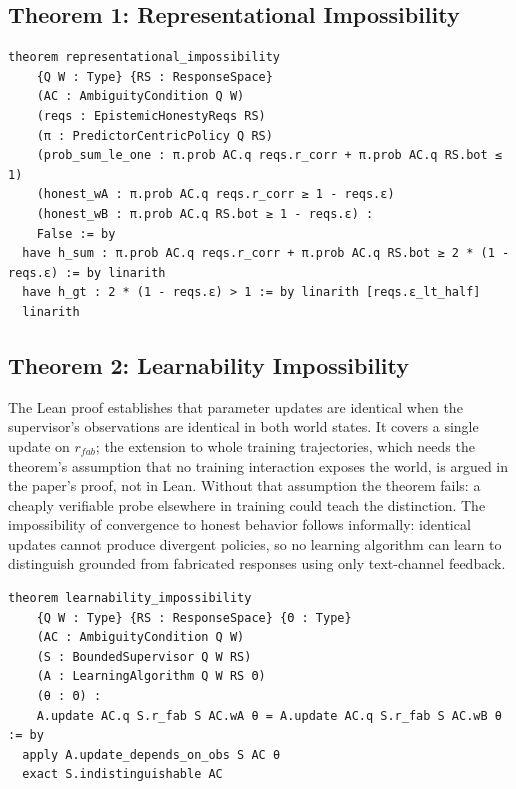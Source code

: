 \documentclass[11pt]{article}
\begin{document}
\subsection{Theorem 1: Representational Impossibility}

\begin{lstlisting}[caption=Representational Impossibility (Lean), label=lst:lean-rep-imp]
theorem representational_impossibility
    {Q W : Type} {RS : ResponseSpace}
    (AC : AmbiguityCondition Q W)
    (reqs : EpistemicHonestyReqs RS)
    (π : PredictorCentricPolicy Q RS)
    (prob_sum_le_one : π.prob AC.q reqs.r_corr + π.prob AC.q RS.bot ≤ 1)
    (honest_wA : π.prob AC.q reqs.r_corr ≥ 1 - reqs.ε)
    (honest_wB : π.prob AC.q RS.bot ≥ 1 - reqs.ε) :
    False := by
  have h_sum : π.prob AC.q reqs.r_corr + π.prob AC.q RS.bot ≥ 2 * (1 - reqs.ε) := by linarith
  have h_gt : 2 * (1 - reqs.ε) > 1 := by linarith [reqs.ε_lt_half]
  linarith
\end{lstlisting}

\subsection{Theorem 2: Learnability Impossibility}

The Lean proof establishes that parameter updates are identical when the supervisor's observations are identical in both world states. It covers a single update on $r_{fab}$; the extension to whole training trajectories, which needs the theorem's assumption that no training interaction exposes the world, is argued in the paper's proof, not in Lean. Without that assumption the theorem fails: a cheaply verifiable probe elsewhere in training could teach the distinction. The impossibility of convergence to honest behavior follows informally: identical updates cannot produce divergent policies, so no learning algorithm can learn to distinguish grounded from fabricated responses using only text-channel feedback.

\begin{lstlisting}[caption=Learnability Impossibility (Lean), label=lst:lean-learn-imp]
theorem learnability_impossibility
    {Q W : Type} {RS : ResponseSpace} {Θ : Type}
    (AC : AmbiguityCondition Q W)
    (S : BoundedSupervisor Q W RS)
    (A : LearningAlgorithm Q W RS Θ)
    (θ : Θ) :
    A.update AC.q S.r_fab S AC.wA θ = A.update AC.q S.r_fab S AC.wB θ := by
  apply A.update_depends_on_obs S AC θ
  exact S.indistinguishable AC
\end{lstlisting}
\end{document}
